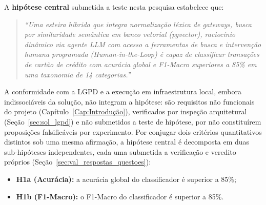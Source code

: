 A \textbf{hipótese central} submetida a teste nesta pesquisa estabelece que:
\begin{quote}
	\textit{``Uma esteira híbrida que integra normalização léxica de gateways, busca por similaridade semântica em banco vetorial (pgvector), raciocínio dinâmico via agente LLM com acesso a ferramentas de busca e intervenção humana programada (\textit{Human-in-the-Loop}) é capaz de classificar transações de cartão de crédito com acurácia global e F1-Macro superiores a 85\% em uma taxonomia de 14 categorias.''}
\end{quote}
A conformidade com a LGPD e a execução em infraestrutura local, embora indissociáveis da solução, não integram a hipótese: são requisitos não funcionais do projeto (Capítulo~\ref{Cap:Introdução}), verificados por inspeção arquitetural (Seção~\ref{sec:sol_lgpd}) e não submetidos a teste de hipótese, por não constituírem proposições falsificáveis por experimento. Por conjugar dois critérios quantitativos distintos sob uma mesma afirmação, a hipótese central é decomposta em duas sub-hipóteses independentes, cada uma submetida a verificação e veredito próprios (Seção~\ref{sec:val_respostas_questoes}):
\begin{itemize}
	\item \textbf{H1a (Acurácia):} a acurácia global do classificador é superior a 85\%;
	\item \textbf{H1b (F1-Macro):} o F1-Macro do classificador é superior a 85\%.
\end{itemize}
